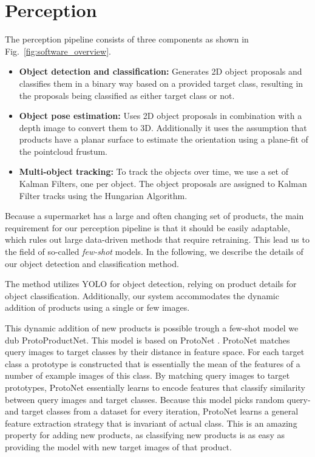 \section{Perception}
\label{sec:perception}

The perception pipeline consists of three components as shown in Fig.~\ref{fig:software_overview}.
\begin{itemize}
    \item \textbf{Object detection and classification:} Generates 2D object proposals and classifies them in a binary way based on a provided target class, resulting in the proposals being classified as either target class or not. 
    \item \textbf{Object pose estimation:} Uses 2D object proposals in combination with a depth image to convert them to 3D. Additionally it uses the assumption that products have a planar surface to estimate the orientation using a plane-fit of the pointcloud frustum.
    \item \textbf{Multi-object tracking:} To track the objects over time, we use a set of Kalman Filters, one per object. The object proposals are assigned to Kalman Filter tracks using the Hungarian Algorithm.
\end{itemize}

Because a supermarket has a large and often changing set of products, the main requirement for our perception pipeline is that it should be easily adaptable, which rules out large data-driven methods that require retraining. This lead us to the field of so-called \textit{few-shot} models. In the following, we describe the details of our object detection and classification method.

The method utilizes YOLO for
object detection, relying on product details for object classification. Additionally, our system accommodates the dynamic addition of products using a single or few images.

This dynamic addition of new products is possible trough a few-shot model we dub ProtoProductNet. This model is based on ProtoNet \cite{protonet_2017}. ProtoNet matches query images to target classes by their distance in feature space. For each target class a prototype is constructed that is essentially the mean of the features of a number of example images of this class. By matching query images to target prototypes, ProtoNet essentially learns to encode features that classify similarity between query images and target classes. Because this model picks random query- and target classes from a dataset for every iteration, ProtoNet learns a general feature extraction strategy that is invariant of actual class. This is an amazing property for adding new products, as classifying new products is as easy as providing the model with new target images of that product.

